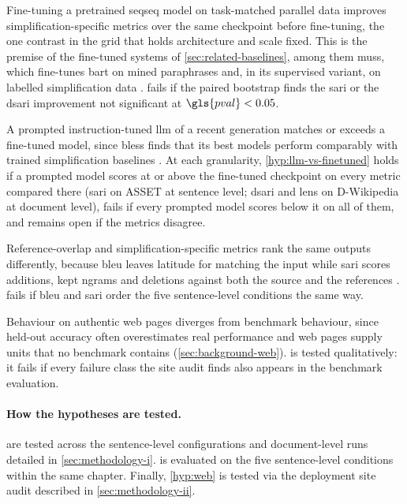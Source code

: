 \begin{hypotheses}
	\item\label{hyp:finetuning} Fine-tuning a pretrained \gls{seqseq} model on task-matched parallel data improves simplification-specific metrics over the same checkpoint before fine-tuning, the one contrast in the grid that holds architecture and scale fixed.
	This is the premise of the fine-tuned systems of \cref{sec:related-baselines}, among them \gls{muss}, which fine-tunes \gls{bart} on mined paraphrases and, in its supervised variant, on labelled simplification data \parencite[1652--1653]{martin-etal-2022-muss}.
	 fails if the paired bootstrap finds the \gls{sari} or the \gls{dsari} improvement not significant at \(\gls{pval} < 0.05\).
	\item\label{hyp:llm-vs-finetuned} A prompted instruction-tuned \gls{llm} of a recent generation matches or exceeds a fine-tuned model, since \gls{bless} finds that its best models perform comparably with trained simplification baselines \parencite[13291]{kew-etal-2023-bless}.
	At each granularity, \cref{hyp:llm-vs-finetuned} holds if a prompted model scores at or above the fine-tuned checkpoint on every metric compared there (\gls{sari} on ASSET at sentence level; \gls{dsari} and \gls{lens} on D-Wikipedia at document level), fails if every prompted model scores below it on all of them, and remains open if the metrics disagree.
	\item\label{hyp:metrics} Reference-overlap and simplification-specific metrics rank the same outputs differently, because \gls{bleu} leaves latitude for matching the input while \gls{sari} scores additions, kept \glspl{ngram} and deletions against both the source and the references \parencite[404--405]{xu-etal-2016-optimizing}.
	 fails if \gls{bleu} and \gls{sari} order the five sentence-level conditions the same way.
	\item\label{hyp:web} Behaviour on authentic web pages diverges from benchmark behaviour, since held-out accuracy often overestimates real performance \parencite[4902]{ribeiro-etal-2020-beyond} and web pages supply units that no benchmark contains (\cref{sec:background-web}).
	 is tested qualitatively: it fails if every failure class the site audit finds also appears in the benchmark evaluation.
\end{hypotheses}

\paragraph{How the hypotheses are tested.}
 are tested across the sentence-level configurations and document-level runs detailed in \cref{sec:methodology-i}.
 is evaluated on the five sentence-level conditions within the same chapter.
Finally, \cref{hyp:web} is tested via the deployment site audit described in \cref{sec:methodology-ii}.
